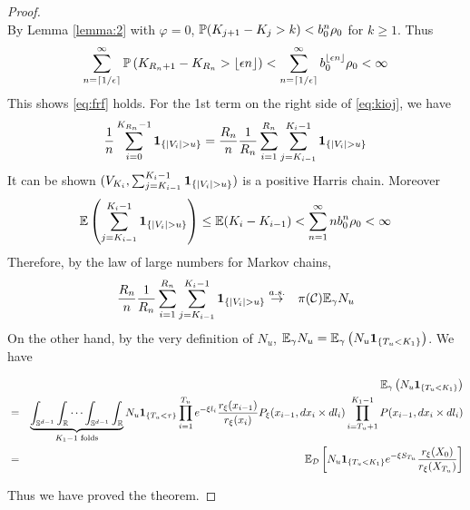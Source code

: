 \documentclass[aoas,preprint]{imsart}
\numberwithin{equation}{section}
\theoremstyle{plain}
\begin{document}
\begin{proof}
\[  \]
  By Lemma \ref{lemma:2} with $\varphi = 0$,
  $\P(K_{j + 1} - K_j > k) < b_0^n \rho_0$ for $k \geq 1$.
  Thus
  \[
    \sum_{n=\ceil{1/\epsilon}}^\infty \P\left(
    {K_{R_n + 1} - K_{R_n}} > \floor{\epsilon n}
  \right)
  <
  \sum_{n=\ceil{1/\epsilon}}^\infty b_0^{\floor{\epsilon n}} \rho_0 < \infty
  \]
  This shows \eqref{eq:frf} holds.
  For the 1st term on the right side of \eqref{eq:kioj}, we have
  \[
  {1 \over n} \sum_{i=0}^{K_{R_n}-1} \1{|V_i| > u}
    =
    {R_n \over n} {1 \over R_n} \sum_{i=1}^{R_n}
    \sum_{j=K_{i-1}}^{K_i-1}\1{|V_i| > u}
  \]
  It can be shown $(V_{K_i}, \sum_{j=K_{i-1}}^{K_i-1}\1{|V_i| > u})$
  is a positive Harris chain. Moreover
  \[
  \E \left(
    \sum_{j=K_{i-1}}^{K_i-1}\1{|V_i| > u}
  \right)
  \leq
  \E (K_i - K_{i-1}) < \sum_{n=1}^\infty n b_0^n \rho_0 < \infty
  \]
  Therefore, by the law of large numbers for Markov chains,
  \begin{eqnarray*}
    {R_n \over n} {1 \over R_n} \sum_{i=1}^{R_n}
    \sum_{j=K_{i-1}}^{K_i-1}\1{|V_i| > u}
    &\overset{a.s.}{\to}& \pi(\mathcal C) \E_\gamma N_u
  \end{eqnarray*}
  On the other hand, by the very definition of $N_u$,
  $\E_\gamma N_u = \E_\gamma \left( N_u \1{T_u < K_1}\right)$. We have
  \begin{small}
    \begin{eqnarray*}
      && \E_\gamma \left( N_u \1{T_u < K_1}\right) \\
      &=&
      \underbrace{
        \int_{\sphere^{d-1}} \int_{\reals}
        \cdots
        \int_{\sphere^{d-1}} \int_{\reals}
      }_{K_1 - 1\text{ folds}}
      N_u \1{T_u < \tau}
      \prod_{i=1}^{T_u} e^{-\xi l_i}
      {r_\xi(x_{i-1}) \over r_\xi(x_{i})}P_\xi(x_{i-1}, dx_i \times dl_i)
      \prod_{i=T_u+1}^{K_1 - 1} P(x_{i-1}, dx_i \times d l_i) \\
      &=&
      \E_{\mathcal D}
      \left[
        N_u \1{T_u < K_1} e^{-\xi S_{T_u}}
        {r_\xi(X_0)
          \over
          r_\xi(X_{T_u})
        }
      \right]
    \end{eqnarray*}
  \end{small}
  Thus we have proved the theorem.
\end{proof}
\end{document}
